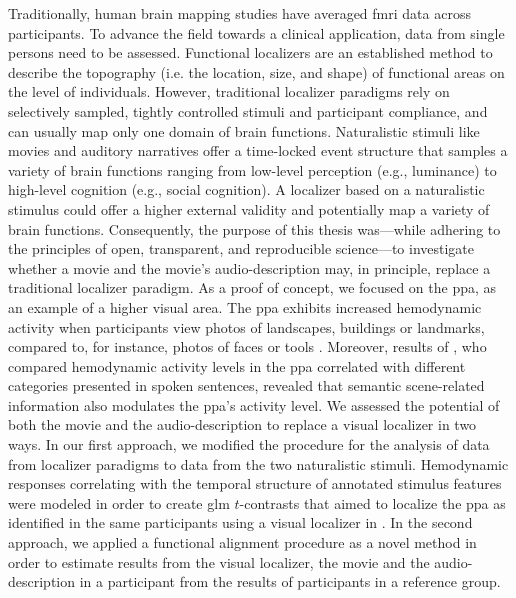 %
Traditionally, human brain mapping studies have averaged \ac{fmri} data across
participants.
%
To advance the field towards a clinical application, data from single persons
need to be assessed.
Functional localizers are an established method to describe the topography (i.e.
the location, size, and shape) of functional areas on the level of individuals.
However, traditional localizer paradigms rely on selectively sampled, tightly
controlled stimuli and participant compliance, and can usually map only one
domain of brain functions.
Naturalistic stimuli like movies and auditory narratives offer a time-locked
event structure that samples a variety of brain functions ranging from low-level
perception (e.g., luminance) to high-level cognition (e.g., social cognition).
%
A localizer based on a naturalistic stimulus could offer a higher external
validity and potentially map a variety of brain functions.
Consequently, the purpose of this thesis was---while adhering to the principles
of open, transparent, and reproducible science---to investigate whether a movie
and the movie's audio-description may, in principle, replace a traditional
localizer paradigm.
As a proof of concept, we focused on the \ac{ppa}, as an example of a higher
visual area.
%
The \ac{ppa} exhibits increased hemodynamic activity when participants view
photos of landscapes, buildings or landmarks, compared to, for instance, photos
of faces or tools \citep[cf,][for reviews]{epstein2014neural, aminoff2013role}.
%
Moreover, results of \citet{aziz2008modulation}, who compared hemodynamic
activity levels in the \ac{ppa} correlated with different categories presented
in spoken sentences, revealed that semantic scene-related information also
modulates the \ac{ppa}'s activity level.
%
We assessed the potential of both the movie and the audio-description to replace
a visual localizer in two ways.
%
In our first approach, we  modified the procedure for the analysis of data from
localizer paradigms to data from the two naturalistic stimuli.
%
Hemodynamic responses correlating with the temporal structure of annotated
stimulus features \citep[cf.][]{haeusler2016cutanno, haeusler2021speechanno}
were modeled in order to create \ac{glm} $t$-contrasts that aimed to localize
the \ac{ppa} as identified in the same participants using a visual localizer in
\citet{sengupta2016extension}.
In the second approach, we applied a functional alignment procedure as a novel
method in order to estimate results from the visual localizer, the movie and the
audio-description in a participant from the results of participants in a
reference group.

